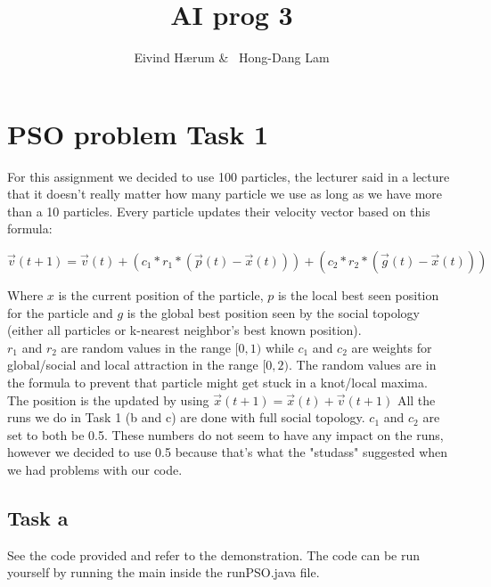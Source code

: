 \documentclass[12pt, a4paper]{article}
\title{AI prog 3}
\author{Eivind Hærum \& \ Hong-Dang Lam}
\begin{document}
\maketitle
% 
% 
 
\newpage
\tableofcontents
\newpage
 
\section{PSO problem Task 1}
For this assignment we decided to use 100 particles, the lecturer said in a lecture that it doesn't really matter how many particle we use as long as we have more than a 10 particles.
Every particle updates their velocity vector based on this formula:
\begin{center}
$\vec{v}(t+1)=\vec{v}(t)+(c_1*r_1*(\vec{p}(t)-\vec{x}(t))) +(c_2*r_2*(\vec{g}(t)-\vec{x}(t)))$
\end{center}
Where $x$ is the current position of the particle, $p$ is the local best seen position for the particle and $g$ is the global best position seen by the social topology (either all particles or k-nearest neighbor's best known position).\\
$r_1$ and $r_2$ are random values in the range $[0,1)$ while $c_1$ and $c_2$ are weights for global/social and local attraction in the range $[0,2)$. The random values are in the formula to prevent that particle might get stuck in a knot/local maxima.\\
The position is the updated by using $\vec{x}(t+1)=\vec{x}(t)+\vec{v}(t+1)$
All the runs we do in Task 1 (b and c) are done with full social topology.
$c_1$ and $c_2$ are set to both be 0.5. These numbers do not seem to have any impact on the runs, however we decided to use 0.5 because that's what the "studass" suggested when we had problems with our code.

\subsection{Task a}
See the code provided and refer to the demonstration.
The code can be run yourself by running the main inside the runPSO.java file.
\end{document}
